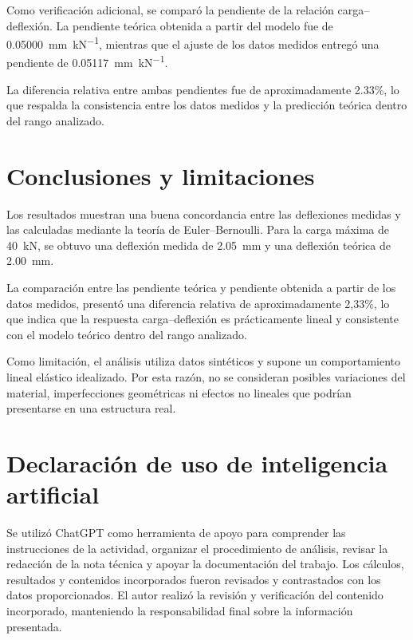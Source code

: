 Como verificación adicional, se comparó la pendiente de la relación carga--deflexión. La pendiente teórica obtenida a partir del modelo fue de
\SI{0.05000}{\milli\metre\per\kilo\newton}, mientras que el ajuste de los datos medidos entregó una pendiente de
\SI{0.05117}{\milli\metre\per\kilo\newton}.

La diferencia relativa entre ambas pendientes fue de aproximadamente 2.33\%, lo que respalda la consistencia entre los datos medidos y la predicción teórica dentro del rango analizado. 

\section{Conclusiones y limitaciones}

Los resultados muestran una buena concordancia entre las deflexiones medidas y las calculadas mediante la teoría de Euler--Bernoulli. Para la carga máxima de \SI{40}{\kilo\newton}, se obtuvo una deflexión medida de \SI{2.05}{\milli\metre} y una deflexión teórica de \SI{2.00}{\milli\metre}.

La comparación entre las pendiente teórica y pendiente obtenida a partir de los datos medidos, presentó una diferencia relativa de aproximadamente 2,33\%, lo que indica que la respuesta carga--deflexión es prácticamente lineal y consistente con el modelo teórico dentro del rango analizado.

Como limitación, el análisis utiliza datos sintéticos y supone un comportamiento lineal elástico idealizado. Por esta razón, no se consideran posibles variaciones del material, imperfecciones geométricas ni efectos no lineales que podrían presentarse en una estructura real.

\section*{Declaración de uso de inteligencia artificial}

Se utilizó ChatGPT como herramienta de apoyo para comprender las instrucciones de la actividad, organizar el procedimiento de análisis, revisar la redacción de la nota técnica y apoyar la documentación del trabajo. Los cálculos, resultados y contenidos incorporados fueron revisados y contrastados con los datos proporcionados. El autor realizó la revisión y verificación del contenido incorporado, manteniendo la responsabilidad final sobre la información presentada.